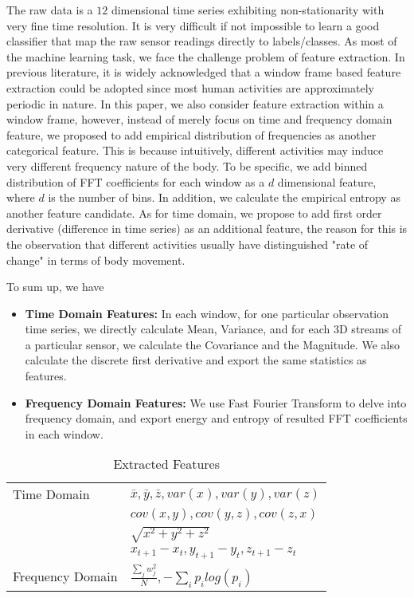 The raw data is a $12$ dimensional time series exhibiting non-stationarity with very fine time resolution. It is very difficult if not impossible to learn a good classifier that map the raw sensor readings directly to labels/classes. As most of the machine learning task, we face the challenge problem of feature extraction. In previous literature, it is widely acknowledged that a window frame based feature extraction could be adopted since most human activities are approximately periodic in nature. In this paper, we also consider feature extraction within a window frame, however, instead of merely focus on time and frequency domain feature, we proposed to add empirical distribution of frequencies as another categorical  feature. This is because intuitively, different activities may induce very different frequency nature of the body. To be specific, we add binned distribution of FFT coefficients for each window as a $d$ dimensional feature, where $d$ is the number of bins. In addition, we calculate the empirical entropy as another feature candidate. As for time domain, we propose to add first order derivative (difference in time series) as an additional feature, the reason for this is the observation that different activities usually have distinguished "rate of change" in terms of body movement.

To sum up, we have
\begin{itemize}
\item \textbf{Time Domain Features:} In each window, for one particular observation time series, we directly calculate Mean, Variance, and for each 3D streams of a particular sensor, we calculate the Covariance and the Magnitude. We also calculate the discrete first derivative and export the same statistics as features. 
\item \textbf{Frequency Domain Features:} We use Fast Fourier Transform to delve into frequency domain, and export energy and entropy of resulted FFT coefficients in each window.
\end{itemize}

\begin{table}
\begin{center}

\begin{tabular}{|l|l|}
      \hline
      \hline
      Time Domain & $\bar{x},\bar{y},\bar{z},var(x),var(y),var(z)$\\
      &$cov(x,y),cov(y,z),cov(z,x)$\\
      &$\sqrt{x^2+y^2+z^2}$\\
      & $x_{t+1}-x_{t},y_{t+1}-y_{t},z_{t+1}-z_{t}$\\
  \hline
  Frequency Domain  & $\frac{\sum_j w_j^2}{N}, -\sum_i p_ilog(p_i)$  \\
  \hline
\end{tabular}
\end{center}
\caption{Extracted Features}
\end{table}

